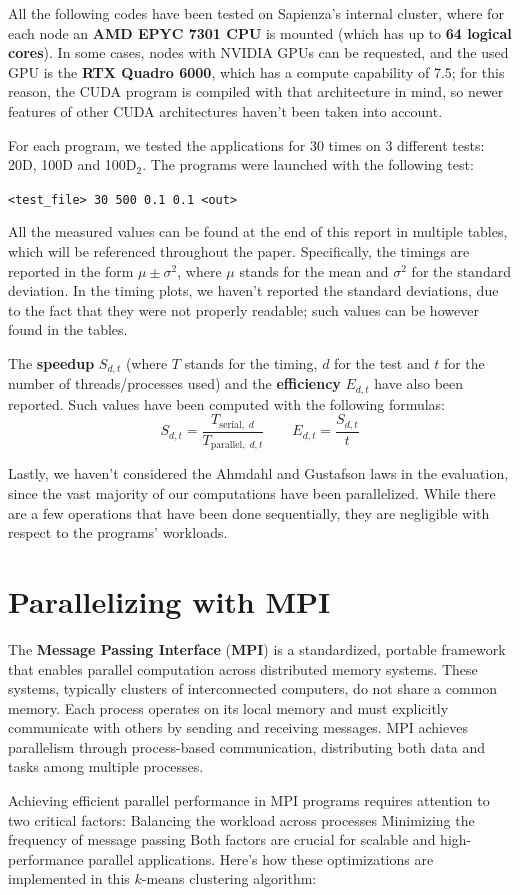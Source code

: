 \documentclass[11pt, journal]{IEEEtran}
\newcommand{\nwl}{

\vspace{11pt}

}
\begin{document}
All the following codes have been tested on Sapienza's internal cluster, where for each node an \textbf{AMD EPYC 7301 CPU} is mounted (which has up to \textbf{64 logical cores}). In some cases, nodes with NVIDIA GPUs can be requested, and the used GPU is the \textbf{RTX Quadro 6000}, which has a compute capability of 7.5; for this reason, the CUDA program is compiled with that architecture in mind, so newer features of other CUDA architectures haven't been taken into account.
\nwl
For each program, we tested the applications for 30 times on 3 different tests: 20D, 100D and 100D$_2$. The programs were launched with the following test:

\begin{center}
    \verb|<test_file> 30 500 0.1 0.1 <out>|
\end{center}

All the measured values can be found at the end of this report in multiple tables, which will be referenced throughout the paper. Specifically, the timings are reported in the form $\mu \pm \sigma^2$, where $\mu$ stands for the mean and $\sigma^2$ for the standard deviation. In the timing plots, we haven't reported the standard deviations, due to the fact that they were not properly readable; such values can be however found in the tables.
\nwl
The \textbf{speedup} $S_{d, t}$ (where $T$ stands for the timing, $d$ for the test and $t$ for the number of threads/processes used) and the \textbf{efficiency} $E_{d, t}$ have also been reported. Such values have been computed with the following formulas:
\[ S_{d, t} = \frac{T_{\text{serial}, \; d}}{T_{\text{parallel}, \; d, t}} \quad \quad E_{d, t} = \frac{S_{d, t}}{t} \]

Lastly, we haven't considered the Ahmdahl and Gustafson laws in the evaluation, since the vast majority of our computations have been parallelized. While there are a few operations that have been done sequentially, they are negligible with respect to the programs' workloads.

\section{Parallelizing with MPI}

The \textbf{Message Passing Interface} (\textbf{MPI}) is a standardized, portable framework that enables parallel computation across distributed memory systems. These systems, typically clusters of interconnected computers, do not share a common memory. Each process operates on its local memory and must explicitly communicate with others by sending and receiving messages. MPI achieves parallelism through process-based communication, distributing both data and tasks among multiple processes.
\nwl
Achieving efficient parallel performance in MPI programs requires attention to two critical factors:
Balancing the workload across processes
Minimizing the frequency of message passing
Both factors are crucial for scalable and high-performance parallel applications. Here's how these optimizations are implemented in this $k$-means clustering algorithm:
\end{document}
